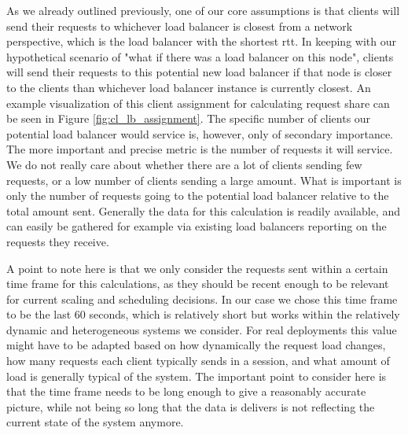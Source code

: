 As we already outlined previously, one of our core assumptions is that clients will send their requests to whichever load balancer is closest from a network perspective, which is the load balancer with the shortest \gls{rtt}.
In keeping with our hypothetical scenario of "what if there was a load balancer on this node", clients will send their requests to this potential new load balancer if that node is closer to the clients than whichever load balancer instance is currently closest.
An example visualization of this client assignment for calculating request share can be seen in Figure \ref{fig:cl_lb_assignment}.
The specific number of clients our potential load balancer would service is, however, only of secondary importance. The more important and precise metric is the number of requests it will service.
We do not really care about whether there are a lot of clients sending few requests, or a low number of clients sending a large amount. What is important is only the number of requests going to the potential load balancer relative to the total amount sent.
Generally the data for this calculation is readily available, and can easily be gathered for example via existing load balancers reporting on the requests they receive.

A point to note here is that we only consider the requests sent within a certain time frame for this calculations, as they should be recent enough to be relevant for current scaling and scheduling decisions.
In our case we chose this time frame to be the last 60 seconds, which is relatively short but works within the relatively dynamic and heterogeneous systems we consider.
For real deployments this value might have to be adapted based on how dynamically the request load changes, how many requests each client typically sends in a session, and what amount of load is generally typical of the system.
The important point to consider here is that the time frame needs to be long enough to give a reasonably accurate picture, while not being so long that the data is delivers is not reflecting the current state of the system anymore.


